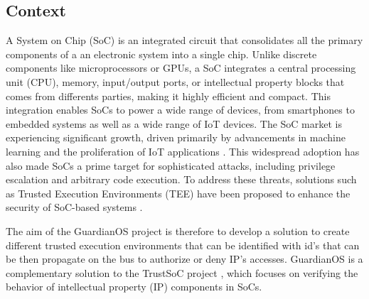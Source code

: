 \documentclass[conference]{IEEEtran}
\begin{document}
\subsection{Context}\label{AA}
A System on Chip (SoC) is an integrated circuit that consolidates all the primary components of a an electronic system into a single chip. Unlike discrete components like microprocessors or GPUs, a SoC integrates a central processing unit (CPU), memory, input/output ports, or intellectual property blocks that comes from differents parties, making it highly efficient and compact. This integration enables SoCs to power a wide range of devices, from smartphones to embedded systems as well as a wide range of IoT devices. The SoC market is experiencing significant growth, driven primarily by advancements in machine learning and the proliferation of IoT applications \cite{noauthor_system--chip_nodate}. This widespread adoption has also made SoCs a prime target for sophisticated attacks, including privilege escalation and arbitrary code execution. To address these threats, solutions such as Trusted Execution Environments (TEE) have been proposed to enhance the security of SoC-based systems \cite{nasahl_hector-v_2021, schneider_sok_2022}.

The aim of the GuardianOS project is therefore to develop a solution to create different trusted execution environments that can be identified with id's that can be then propagate on the bus to authorize or deny IP's accesses. GuardianOS is a complementary solution to the TrustSoC project \cite{milan_trustsoc_2023}, which focuses on verifying the behavior of intellectual property (IP) components in SoCs. 
\end{document}
